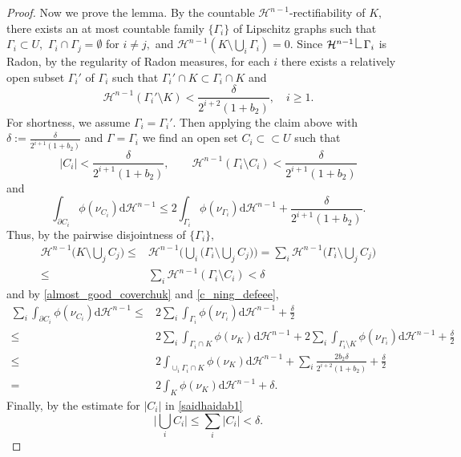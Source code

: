 \documentclass[reqno]{amsart}
\numberwithin{equation}{section}
\theoremstyle{plain}
\theoremstyle{definition}
\newcommand{\cH}{\mathcal{H}}
\newcommand{\p}{\partial}
\newcommand{\bound}{b}
\renewcommand{\d}{\mathrm{d}}
\newcommand{\strictlyincluded}{\subset\subset}
\newcommand{\res}{\mathop{\hbox{\vrule height 9pt width 0.5pt depth 0pt
\vrule height 0.5pt width 5pt depth 0pt}}\nolimits}
\begin{document}
\begin{proof}
Now we prove the lemma. By the countable $\cH^{n-1}$-rectifiability of $K,$ there exists an at most countable family $\{\Gamma_i\}$ of Lipschitz graphs such that $\Gamma_i\subset U,$ $\Gamma_i\cap \Gamma_j=\emptyset$
for $i\ne j,$ and $\cH^{n-1}(K \setminus \bigcup_i \Gamma_i)=0.$ Since $\cH^{n-1}\res \Gamma_i$ is Radon, by the regularity of Radon measures, for each $i$ there exists a relatively open subset $\Gamma_i'$ of $\Gamma_i$ such that $\Gamma_i'\cap K \subset \Gamma_i \cap K $ and
\begin{equation}\label{almost_good_coverchuk}
\cH^{n-1}(\Gamma_i' \setminus K )<\frac{\delta}{2^{i+2}(1+\bound_2)},\quad i\ge1. 
\end{equation}
%
For shortness, we assume $\Gamma_i=\Gamma_i'$.
Then applying the claim above with $\delta:=\frac{\delta}{2^{i+1}(1+\bound_2)}$ and $\Gamma=\Gamma_i$ we find an open set $C_i\strictlyincluded U $ such that 
\begin{equation}\label{saidhaidab1}
|C_i|< \frac{\delta}{2^{i+1}(1+\bound_2)},\qquad 
\cH^{n-1}(\Gamma_i\setminus C_i) < \frac{\delta}{2^{i+1} (1+\bound_2)} 
\end{equation}
%
and 
%
\begin{equation}\label{c_ning_defeee}
\int_{\p C_i} \phi(\nu_{C_i}^{})\d\cH^{n-1} \le 2\int_{\Gamma_i} \phi(\nu_{\Gamma_i})\d\cH^{n-1} + \frac{\delta}{2^{i+1}  (1+\bound_2)}. 
\end{equation}
%
Thus, by the pairwise disjointness of $\{\Gamma_i\},$
\begin{align*}
\cH^{n-1}\Big(K\setminus \bigcup_j C_j\Big) \le & \cH^{n-1}\Big(\bigcup_i \Big(\Gamma_i\setminus \bigcup_j C_j\Big)\Big) = \sum_i \cH^{n-1}\Big(\Gamma_i\setminus \bigcup_j C_j\Big)\\
\le & \sum_i \cH^{n-1}(\Gamma_i\setminus C_i) < \delta 
\end{align*}
and by \eqref{almost_good_coverchuk} and \eqref{c_ning_defeee},
$$
\begin{aligned}
\sum\limits_i \int_{\p C_i} \phi(\nu_{C_i}^{})\d\cH^{n-1} \le & 2\sum\limits_i \int_{\Gamma_i} \phi(\nu_{\Gamma_i})\d\cH^{n-1} + \frac{\delta}{2}\\
\le & 2\sum\limits_i \int_{\Gamma_i\cap  K} \phi(\nu_{K})\d\cH^{n-1} +2 \sum\limits_i \int_{\Gamma_i\setminus K} \phi(\nu_{\Gamma_i})\d\cH^{n-1}+ \frac{\delta}{2}\\
\le & 2\int_{\cup_i \Gamma_i \cap K} \phi(\nu_{K})\d\cH^{n-1} + 
\sum\limits_i \frac{2\bound_2\delta}{2^{i+2}(1+\bound_2)} + \frac{\delta}{2}\\
= & 2\int_K \phi(\nu_{K})\d\cH^{n-1} + \delta.
\end{aligned}
$$
Finally, by the estimate for $|C_i|$ in \eqref{saidhaidab1}
$$
\Big|\bigcup_i C_i\Big| \le \sum\limits_{i} |C_i| <\delta.
$$
\end{proof}
\end{document}
